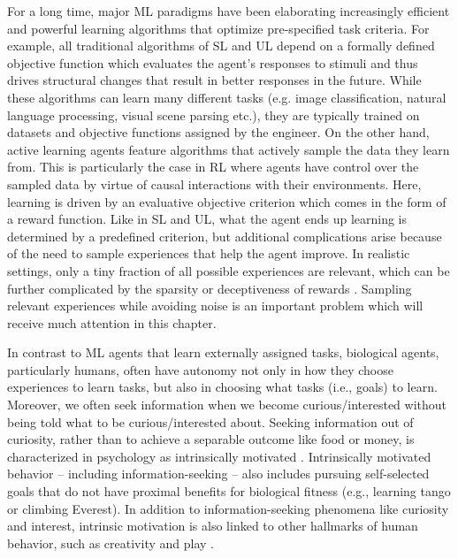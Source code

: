 For a long time, major \ac{ML} paradigms have been elaborating increasingly efficient and powerful learning algorithms that optimize pre-specified task criteria. For example, all traditional algorithms of \ac{SL} and \ac{UL} depend on a formally defined objective function which evaluates the agent’s responses to stimuli and thus drives structural changes that result in better responses in the future. While these algorithms can learn many different tasks (e.g. image classification, natural language processing, visual scene parsing etc.), they are typically trained on datasets and objective functions assigned by the engineer. On the other hand, active learning agents \parencite{thrun_lifelong_1994,cohn_active_1995} feature algorithms that actively sample the data they learn from. This is particularly the case in \acf{RL} \parencite{sutton2018reinforcement} where agents have control over the sampled data by virtue of causal interactions with their environments. Here, learning is driven by an evaluative objective criterion which comes in the form of a reward function. Like in \ac{SL} and \ac{UL}, what the agent ends up learning is determined by a predefined criterion, but additional complications arise because of the need to sample experiences that help the agent improve. In realistic settings, only a tiny fraction of all possible experiences are relevant, which can be further complicated by the sparsity or deceptiveness of rewards \parencite[see ][]{oudeyer_computational_2018}. Sampling relevant experiences while avoiding noise is an important problem which will receive much attention in this chapter.

In contrast to \ac{ML} agents that learn externally assigned tasks, biological agents, particularly humans, often have autonomy not only in how they choose experiences to learn tasks, but also in choosing what tasks (i.e., goals) to learn. Moreover, we often seek information when we become curious/interested without being told what to be curious/interested about. Seeking information out of curiosity, rather than to achieve a separable outcome like food or money, is characterized in psychology as intrinsically motivated \parencite{harlow_learning_1950,ryan_self-determination_2000}. Intrinsically motivated behavior -- including information-seeking -- also includes pursuing self-selected goals that do not have proximal benefits for biological fitness (e.g., learning tango or climbing Everest). In addition to information-seeking phenomena like curiosity and interest, intrinsic motivation is also linked to other hallmarks of human behavior, such as creativity \parencite{gross_cultivating_2020} and play \parencite{chu_play_2020}.

